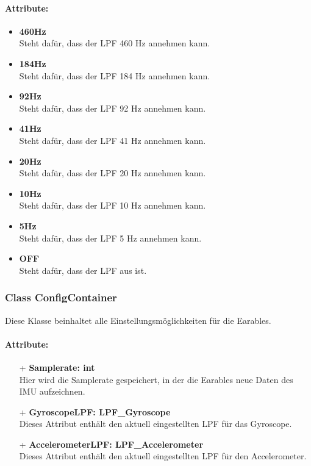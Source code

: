\documentclass[a4paper,12pt]{article}
\begin{document}
\paragraph{Attribute:}
\begin{itemize}
	\item \textbf{460Hz}\\Steht dafür, dass der LPF 460 Hz annehmen kann.
	\item \textbf{184Hz}\\Steht dafür, dass der LPF 184 Hz annehmen kann.
	\item \textbf{92Hz}\\Steht dafür, dass der LPF 92 Hz annehmen kann.
	\item \textbf{41Hz}\\Steht dafür, dass der LPF 41 Hz annehmen kann.
	\item \textbf{20Hz}\\Steht dafür, dass der LPF 20 Hz annehmen kann.
	\item \textbf{10Hz}\\Steht dafür, dass der LPF 10 Hz annehmen kann.
	\item \textbf{5Hz}\\Steht dafür, dass der LPF 5 Hz annehmen kann.
	\item \textbf{OFF}\\Steht dafür, dass der LPF aus ist.
\end{itemize}


\subsubsection{Class ConfigContainer}
Diese Klasse beinhaltet alle Einstellungsmöglichkeiten für die \Gls{Earables}.

\paragraph{Attribute:}
\begin{itemize}
	\item[+] \textbf{Samplerate: int}\\Hier wird die Samplerate gespeichert, in der die \Gls{Earables} neue Daten des IMU aufzeichnen.
	\item[+] \textbf{GyroscopeLPF: LPF\_Gyroscope}\\Dieses Attribut enthält den aktuell eingestellten LPF für das Gyroscope.
	\item[+] \textbf{AccelerometerLPF: LPF\_Accelerometer}\\Dieses Attribut enthält den aktuell eingestellten LPF für den Accelerometer.
\end{itemize}
\end{document}
